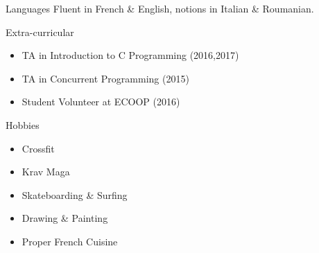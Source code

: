 


\begin{cvskills}


\cvskill
{Languages} %
{Fluent in French \& English, notions in Italian \& Roumanian.} %

\cvskill
{Extra-curricular}
{
	\begin{itemize}
	\item TA in Introduction to C Programming (2016,2017)
	\item TA in Concurrent Programming (2015)
	\item Student Volunteer at ECOOP (2016)
	\end{itemize}
}

\cvskill
{Hobbies}
{
	\begin{itemize}
		\item Crossfit
		\item Krav Maga
		\item Skateboarding \& Surfing
		\item Drawing \& Painting
		\item Proper French Cuisine 
	\end{itemize}
}

\end{cvskills}
